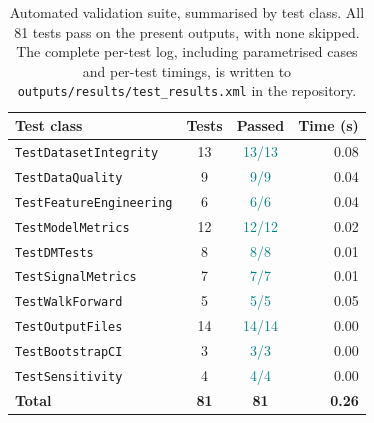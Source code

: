 \begin{table}[H]
\centering
\small
\caption{Automated validation suite, summarised by test class. All 81 tests pass on the present outputs, with none skipped. The complete per-test log, including parametrised cases and per-test timings, is written to \texttt{outputs/results/test\_results.xml} in the repository.}
\label{tab:test_report}
\begin{tabular}{lccr}
\toprule
Test class & Tests & Passed & Time (s) \\
\midrule
\texttt{TestDatasetIntegrity} & 13 & \textcolor{teal}{13/13} & 0.08 \\
\texttt{TestDataQuality} & 9 & \textcolor{teal}{9/9} & 0.04 \\
\texttt{TestFeatureEngineering} & 6 & \textcolor{teal}{6/6} & 0.04 \\
\texttt{TestModelMetrics} & 12 & \textcolor{teal}{12/12} & 0.02 \\
\texttt{TestDMTests} & 8 & \textcolor{teal}{8/8} & 0.01 \\
\texttt{TestSignalMetrics} & 7 & \textcolor{teal}{7/7} & 0.01 \\
\texttt{TestWalkForward} & 5 & \textcolor{teal}{5/5} & 0.05 \\
\texttt{TestOutputFiles} & 14 & \textcolor{teal}{14/14} & 0.00 \\
\texttt{TestBootstrapCI} & 3 & \textcolor{teal}{3/3} & 0.00 \\
\texttt{TestSensitivity} & 4 & \textcolor{teal}{4/4} & 0.00 \\
\midrule
\textbf{Total} & \textbf{81} & \textbf{81} & \textbf{0.26} \\
\bottomrule
\end{tabular}
\end{table}